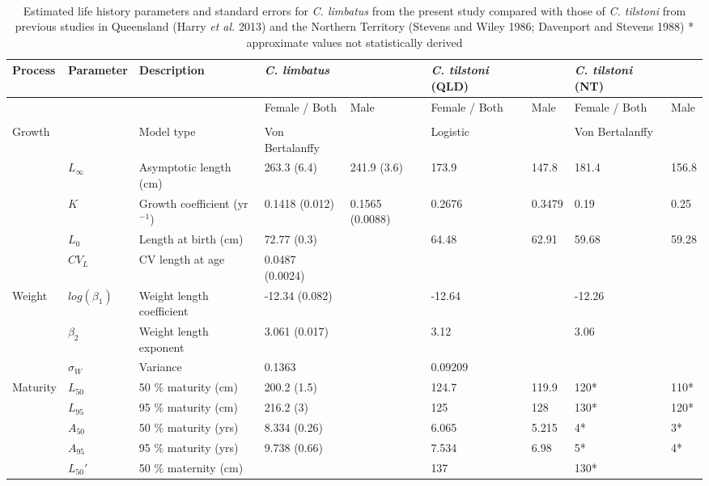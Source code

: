 \documentclass[]{article}
\begin{document}
\newpage \begin{landscape}
\
\
\begin{table}[ht]
\centering
\caption{Estimated life history parameters and standard errors for \textit{C. limbatus} 
                    from the present study compared with those of
                    \textit{C. tilstoni} from previous studies in Queensland (Harry \textit{et al.} 2013)
                    and the Northern Territory (Stevens and Wiley 1986; Davenport and Stevens 1988) * approximate values not statistically derived \newline} 
\begin{tabular}{lllllllll}
  \toprule
Process & Parameter & Description & \textit{C. limbatus} &   & \textit{C. tilstoni} (QLD) &      & \textit{C. tilstoni} (NT) &    \\ 
  \midrule
 &  &  & Female / Both & Male & Female / Both & Male & Female / Both & Male \\ 
   &  &  &  &  &  &  &  &  \\ 
  Growth &  & Model type & Von Bertalanffy &  & Logistic &  & Von Bertalanffy &  \\ 
   & $L_{\infty}$ & Asymptotic length (cm) & 263.3 (6.4) & 241.9 (3.6) & 173.9 & 147.8 & 181.4 & 156.8 \\ 
   & $K$ & Growth coefficient (yr$^{-1}$) & 0.1418 (0.012) & 0.1565 (0.0088) & 0.2676 & 0.3479 & 0.19 & 0.25 \\ 
   & $L_0$ & Length at birth (cm) & 72.77 (0.3) &  & 64.48 & 62.91 & 59.68 & 59.28 \\ 
   & $CV_L$ & CV length at age & 0.0487 (0.0024) &  &  &  &  &  \\ 
  Weight & $log(\beta_1)$ & Weight length coefficient & -12.34 (0.082) &  & -12.64 &  & -12.26 &  \\ 
   & $\beta_2$ & Weight length exponent & 3.061 (0.017) &  & 3.12 &  & 3.06 &  \\ 
   & $\sigma_W$ & Variance & 0.1363  &  & 0.09209 &  &  &  \\ 
  Maturity & $L_{50}$ & 50 $\%$ maturity (cm) & 200.2 (1.5) &  & 124.7 & 119.9 & 120* & 110* \\ 
   & $L_{95}$ & 95 $\%$ maturity (cm) & 216.2 (3) &  & 125 & 128 & 130* & 120* \\ 
   & $A_{50}$ & 50 $\%$ maturity (yrs) & 8.334 (0.26) &  & 6.065 & 5.215 & 4* & 3* \\ 
   & $A_{95}$ & 95  $\%$ maturity (yrs) & 9.738 (0.66) &  & 7.534 & 6.98 & 5* & 4* \\ 
   & $L_{50}\prime$ & 50 $\%$ maternity (cm) &  &  & 137 &  & 130* &  \\ 

\end{tabular}
\end{table}
\end{landscape}
\end{document}
